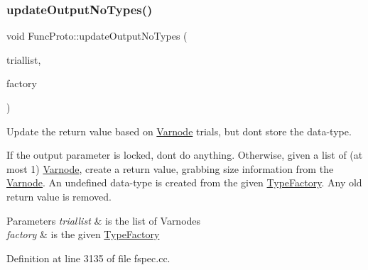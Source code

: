\subsubsection{\texorpdfstring{updateOutputNoTypes()}{updateOutputNoTypes()}}
{\footnotesize\ttfamily void Func\+Proto\+::update\+Output\+No\+Types (\begin{DoxyParamCaption}\item[{const vector$<$ \mbox{\hyperlink{class_varnode}{Varnode}} $\ast$ $>$ \&}]{triallist,  }\item[{\mbox{\hyperlink{class_type_factory}{Type\+Factory}} $\ast$}]{factory }\end{DoxyParamCaption})}



Update the return value based on \mbox{\hyperlink{class_varnode}{Varnode}} trials, but don\textquotesingle{}t store the data-\/type. 

If the output parameter is locked, don\textquotesingle{}t do anything. Otherwise, given a list of (at most 1) \mbox{\hyperlink{class_varnode}{Varnode}}, create a return value, grabbing size information from the \mbox{\hyperlink{class_varnode}{Varnode}}. An undefined data-\/type is created from the given \mbox{\hyperlink{class_type_factory}{Type\+Factory}}. Any old return value is removed. 
\begin{DoxyParams}{Parameters}
{\em triallist} & is the list of Varnodes \\
\hline
{\em factory} & is the given \mbox{\hyperlink{class_type_factory}{Type\+Factory}} \\
\hline
\end{DoxyParams}


Definition at line 3135 of file fspec.\+cc.

